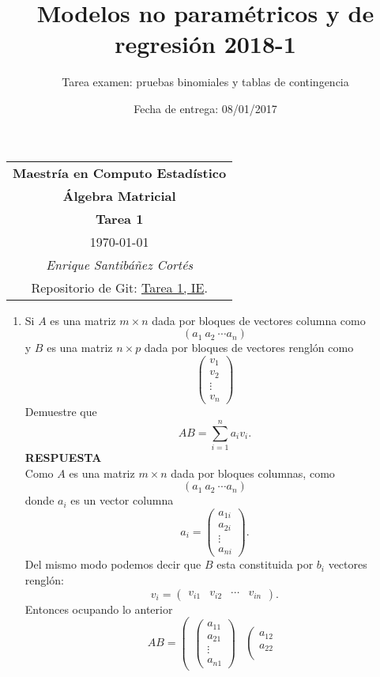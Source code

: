 \documentclass[11pt,letterpaper]{article}
\title{Modelos no paramétricos y de regresión 2018-1}
\author{Tarea examen: pruebas binomiales y tablas de contingencia}
\date{Fecha de entrega: 08/01/2017}
\newcommand{\res}{\textbf{RESPUESTA}\\}
\begin{document}
\begin{table}[ht]
\centering
\begin{tabular}{c}
\textbf{Maestría en Computo Estadístico}\\
\textbf{Álgebra Matricial} \\
\textbf{Tarea 1}\\
\today \\
\emph{Enrique Santibáñez Cortés}\\
Repositorio de Git: \href{https://github.com/Enriquesec/Inferencia_Estad-stica/tree/master/Tareas/Tarea_1}{Tarea 1, IE}.
\end{tabular}
\end{table}

\begin{enumerate}
\item Si $A$ es una matriz $m\times n$ dada por bloques de vectores columna como $$ (a_1\ a_2\ \cdots a_n)$$ y $B$ es una matriz $n\times p$ dada por bloques de vectores renglón como
\begin{equation*}
\left(\begin{array}{c}
v_1\\
v_2\\
\vdots \\
v_n
\end{array}
\right)
\end{equation*}
Demuestre que $$AB=\sum_{i=1}^na_iv_i.$$
\res
Como $A$ es una matriz $m\times n$ dada por bloques columnas, como
$$(a_1\ a_2\ \cdots a_n)$$
donde $a_i$ es un vector columna 
$$a_i=\left( \begin{array}{c}
a_{1i}\\
a_{2i}\\
\vdots\\
a_{ni}
\end{array}\right).$$
Del mismo modo podemos decir que $B$ esta constituida por $b_i$ vectores renglón:
$$v_i=(\begin{array}{cccc}
v_{i1} & v_{i2} & \cdots &v_{in}
\end{array} ).$$
Entonces ocupando lo anterior
$$AB=\left( \begin{array}{cccc}
\left( \begin{array}{c}
a_{11}\\
a_{21}\\
\vdots\\
a_{n1}
\end{array}\right) & 
\left( \begin{array}{c}
a_{12}\\
a_{22}\\

\end{array}
\end{array}$$
\end{enumerate}
\end{document}
